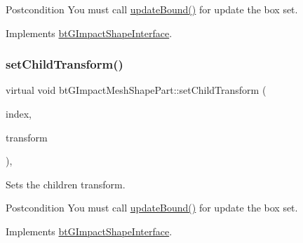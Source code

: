 \begin{DoxyPostcond}{Postcondition}
You must call \hyperlink{classbtGImpactShapeInterface_acb26c2d7a2aecabd06b996b72b848492}{update\+Bound()} for update the box set. 
\end{DoxyPostcond}


Implements \hyperlink{classbtGImpactShapeInterface_a83392f97bd7dfeb71ccdce6913a465b0}{bt\+G\+Impact\+Shape\+Interface}.

\mbox{\label{classbtGImpactMeshShapePart_a0a97d3769fb7d3f583e41da6b284bcc1}} 
\subsubsection{\texorpdfstring{set\+Child\+Transform()}{setChildTransform()}\hspace{0.1cm}{\footnotesize\ttfamily [2/2]}}
{\footnotesize\ttfamily virtual void bt\+G\+Impact\+Mesh\+Shape\+Part\+::set\+Child\+Transform (\begin{DoxyParamCaption}\item[{int}]{index,  }\item[{const bt\+Transform \&}]{transform }\end{DoxyParamCaption})\hspace{0.3cm}{\ttfamily [inline]}, {\ttfamily [virtual]}}



Sets the children transform. 

\begin{DoxyPostcond}{Postcondition}
You must call \hyperlink{classbtGImpactShapeInterface_acb26c2d7a2aecabd06b996b72b848492}{update\+Bound()} for update the box set. 
\end{DoxyPostcond}


Implements \hyperlink{classbtGImpactShapeInterface_a83392f97bd7dfeb71ccdce6913a465b0}{bt\+G\+Impact\+Shape\+Interface}.

\mbox{\label{classbtGImpactMeshShapePart_a2c1de297d020a75e1ab0f10f7c71478f}} 

